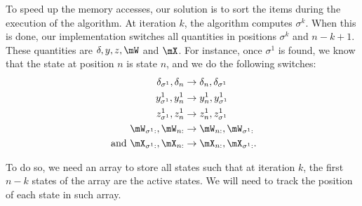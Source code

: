 \begin{subappendices}
To speed up the memory accesses, our solution is to sort the items during the execution of the algorithm. At iteration $k$, the algorithm computes $\sigma^{k}$. When this is done, our implementation switches all quantities in positions $\sigma^{k}$ and $n-k+1$. These quantities are $\delta, y, z, \mW$ and $\mX$. For instance, once $\sigma^1$ is found, we know that the state at position $n$ is state $n$, and we do the following switches:
\begin{align*}
    \delta_{\sigma^1}, \delta_{n} &\rightarrow \delta_{n}, \delta_{\sigma^1} \\
    y^1_{\sigma^1}, y^1_{n} &\rightarrow y^1_{n}, y^1_{\sigma^1} \\
    z^1_{\sigma^1}, z^1_{n} &\rightarrow z^1_{n}, z^1_{\sigma^1} \\
    \mW_{\sigma^1 :}, \mW_{n :} &\rightarrow \mW_{n:}, \mW_{\sigma^1:} \\
    \text{ and } \mX_{\sigma^1 :}, \mX_{n :} &\rightarrow \mX_{n :}, \mX_{\sigma^1 :}.
\end{align*}

To do so, we need an array to store all states such that at iteration $k$, the first $n-k$ states of the array are the active states. We will need to track the position of each state in such array.


\end{subappendices}
